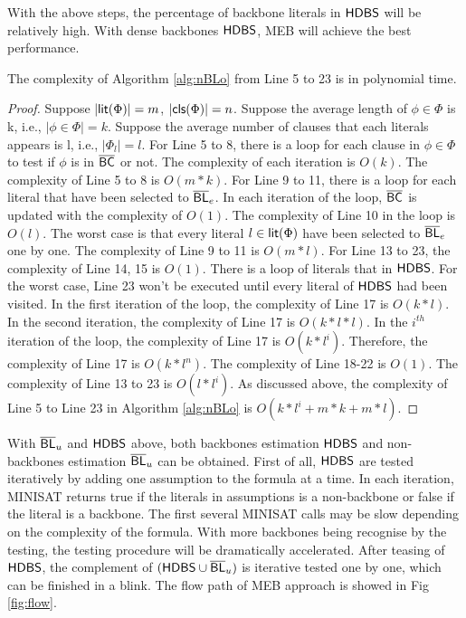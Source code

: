 With the above steps, the percentage of backbone literals in $\textsf{HDBS}$ will be relatively high. With dense backbones $\textsf{HDBS}$, MEB will achieve the best performance.
\begin{theorem}
The complexity of Algorithm \ref{alg:nBLo} from Line 5 to 23 is in polynomial time.
\end{theorem}
\begin{proof}
Suppose $|\textsf{lit}(\Phi)|=m$, $|\textsf{cls}(\Phi)|=n$.
Suppose the average length of $\phi\in\Phi$ is k, i.e., $|\phi\in\Phi|=k$.
Suppose the average number of clauses that each literals appears is l, i.e., $|\Phi_l|=l$.
For Line 5 to 8, there is a loop for each clause in $\phi\in\Phi$ to test if $\phi$ is in $\overline{\textsf{BC}}$ or not.  The complexity of each iteration is $O(k)$. The complexity of Line 5 to 8 is $O(m*k)$.
For Line 9 to 11, there is a loop for each literal that have been selected to $\overline{\textsf{BL}}_e$. In each iteration of the loop, $\overline{\textsf{BC}}$ is updated with the complexity of $O(1)$. The complexity of Line 10 in the loop is $O(l)$. The worst case is that every literal $l\in\textsf{lit}(\Phi)$ have been selected to $\overline{\textsf{BL}}_e$ one by one. The complexity of Line 9 to 11 is $O(m*l)$.
For Line 13 to 23, the complexity of Line 14, 15 is $O(1)$. There is a loop of literals that in $\textsf{HDBS}$. For the worst case, Line 23 won't be executed until every literal of $\textsf{HDBS}$ had been visited. In the first iteration of the loop, the complexity of Line 17 is $O(k*l)$. In the second iteration, the complexity of Line 17 is $O(k*l*l)$. In the $i^{th}$ iteration of the loop, the complexity of Line 17 is $O(k*l^i)$. Therefore, the complexity of Line 17 is $O(k*l^n)$. The complexity of Line 18-22 is $O(1)$. The complexity of Line 13 to 23 is $O(l*l^i)$.
As discussed above, the complexity of Line 5 to Line 23 in Algorithm \ref{alg:nBLo} is $O(k*l^i+m*k+m*l)$.
\end{proof}

\medskip
With $\overline{\textsf{BL}}_u$ and $\textsf{HDBS}$ above, both backbones estimation $\textsf{HDBS}$ and non-backbones estimation $\overline{\textsf{BL}}_u$ can be obtained.  First of all, $\textsf{HDBS}$ are tested iteratively by adding one assumption to the formula at a time. In each iteration, MINISAT returns true if the literals in assumptions is a non-backbone or false if the literal is a backbone. The first several MINISAT calls may be slow depending on the complexity of the formula. With more backbones being recognise by the testing, the testing procedure will be dramatically accelerated. After teasing of $\textsf{HDBS}$, the complement of $(\textsf{HDBS}\cup\overline{\textsf{BL}}_u)$ is iterative tested one by one, which can be finished in a blink. The flow path of MEB approach is showed in Fig \ref{fig:flow}.


